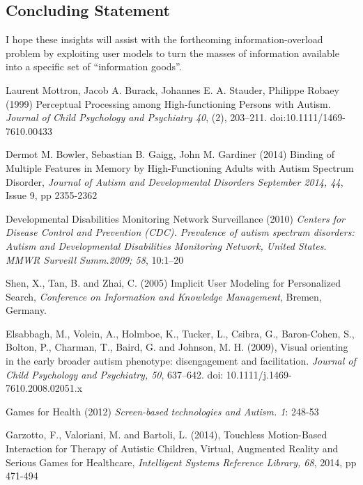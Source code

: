 \documentclass[a4paper, 10pt]{article}
\begin{document}
\subsection{Concluding Statement}\label{future}
I hope these insights will assist with the forthcoming information-overload problem by exploiting user models to turn the masses of information available into a specific set of “information goods”. 

\begin{thebibliography}{100}

 Laurent Mottron, Jacob A. Burack, Johannes E. A. Stauder, Philippe Robaey (1999) Perceptual Processing among High-functioning Persons with Autism. \textit{Journal of Child Psychology and Psychiatry 40}, (2), 203–211. doi:10.1111/1469-7610.00433

Dermot M. Bowler, Sebastian B. Gaigg, John M. Gardiner (2014) Binding of Multiple Features in Memory by High-Functioning Adults with Autism Spectrum Disorder, \textit{Journal of Autism and Developmental Disorders September 2014, 44}, Issue 9, pp 2355-2362

Developmental Disabilities Monitoring Network Surveillance (2010) \textit{Centers for Disease Control and Prevention (CDC). Prevalence of autism spectrum disorders: Autism and Developmental Disabilities Monitoring Network, United States. MMWR Surveill Summ.2009; 58}, 10:1–20

Shen, X., Tan, B. and Zhai, C. (2005) Implicit User Modeling for Personalized Search, \textit{Conference on Information and Knowledge Management}, Bremen, Germany.

Elsabbagh, M., Volein, A., Holmboe, K., Tucker, L., Csibra, G., Baron-Cohen, S., Bolton, P., Charman, T., Baird, G. and Johnson, M. H. (2009), Visual orienting in the early broader autism phenotype: disengagement and facilitation. \textit{Journal of Child Psychology and Psychiatry, 50}, 637–642. doi: 10.1111/j.1469-7610.2008.02051.x

 Games for Health (2012) \textit{Screen-based technologies and Autism. 1}: 248-53

 Garzotto, F., Valoriani, M. and Bartoli, L. (2014), Touchless Motion-Based Interaction for Therapy of Autistic Children, Virtual, Augmented Reality and Serious Games for Healthcare, \textit{Intelligent Systems Reference Library, 68}, 2014, pp 471-494


\end{thebibliography}
\end{document}
